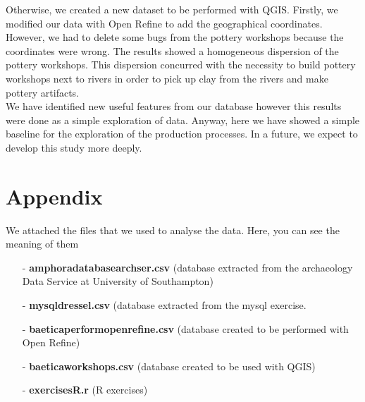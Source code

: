 \documentclass[10pt,a4paper]{article}
\begin{document}
Otherwise, we created a new dataset to be performed with QGIS. Firstly, we modified our data with Open Refine to add the geographical coordinates. However, we had to delete some bugs from the pottery workshops because the coordinates were wrong. The results showed a homogeneous dispersion of the pottery workshops. This dispersion concurred with the necessity to build pottery workshops next to rivers in order to pick up clay from the rivers and make pottery artifacts. \\

We have identified new useful features from our database however this results were done as a simple exploration of data. Anyway, here we have showed a simple baseline for the exploration of the production processes. In a future, we expect to develop this study more deeply. 

\newpage

\section{Appendix}

We attached the files that we used to analyse the data. Here, you can see the meaning of them

\begin{itemize}
\item[-]\textbf{amphoradatabasearchser.csv} (database extracted from the archaeology  Data Service at University of Southampton)
\item[-]\textbf{mysqldressel.csv} (database extracted from the mysql exercise. 
\item[-]\textbf{baeticaperformopenrefine.csv} (database created to be performed with Open Refine)
\item[-]\textbf{baeticaworkshops.csv} (database created to be used with QGIS)
\item[-]\textbf{exercisesR.r} (R exercises)

\end{itemize} 
\end{document}
